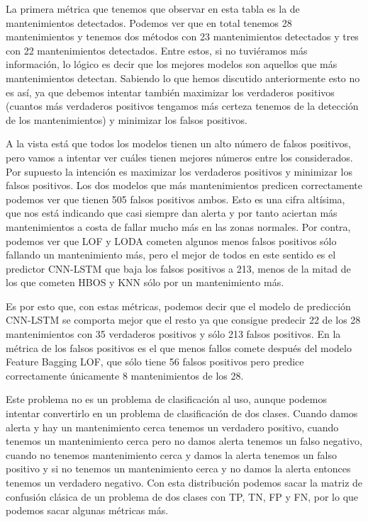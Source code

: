 La primera métrica que tenemos que observar en esta tabla es la de mantenimientos detectados. Podemos ver que en total tenemos 28 mantenimientos y tenemos dos métodos con 23 mantenimientos detectados y tres con 22 mantenimientos detectados. Entre estos, si no tuviéramos más información, lo lógico es decir que los mejores modelos son aquellos que más mantenimientos detectan. Sabiendo lo que hemos discutido anteriormente esto no es así, ya que debemos intentar también maximizar los verdaderos positivos (cuantos más verdaderos positivos tengamos más certeza tenemos de la detección de los mantenimientos) y minimizar los falsos positivos.

A la vista está que todos los modelos tienen un alto número de falsos positivos, pero vamos a intentar ver cuáles tienen mejores números entre los considerados. Por supuesto la intención es maximizar los verdaderos positivos y minimizar los falsos positivos. Los dos modelos que más mantenimientos predicen correctamente podemos ver que tienen 505 falsos positivos ambos. Esto es una cifra altísima, que nos está indicando que casi siempre dan alerta y por tanto aciertan más mantenimientos a costa de fallar mucho más en las zonas normales. Por contra, podemos ver que LOF y LODA cometen algunos menos falsos positivos sólo fallando un mantenimiento más, pero el mejor de todos en este sentido es el predictor CNN-LSTM que baja los falsos positivos a 213, menos de la mitad de los que cometen HBOS y KNN sólo por un mantenimiento más.

Es por esto que, con estas métricas, podemos decir que el modelo de predicción CNN-LSTM se comporta mejor que el resto ya que consigue predecir 22 de los 28 mantenimientos con 35 verdaderos positivos y sólo 213 falsos positivos. En la métrica de los falsos positivos es el que menos fallos comete después del modelo Feature Bagging LOF, que sólo tiene 56 falsos positivos pero predice correctamente únicamente 8 mantenimientos de los 28. 

Este problema no es un problema de clasificación al uso, aunque podemos intentar convertirlo en un problema de clasificación de dos clases. Cuando damos alerta y hay un mantenimiento cerca tenemos un verdadero positivo, cuando tenemos un mantenimiento cerca pero no damos alerta tenemos un falso negativo, cuando no tenemos mantenimiento cerca y damos la alerta tenemos un falso positivo y si no tenemos un mantenimiento cerca y no damos la alerta entonces tenemos un verdadero negativo. Con esta distribución podemos sacar la matriz de confusión clásica de un problema de dos clases con TP, TN, FP y FN, por lo que podemos sacar algunas métricas más.

